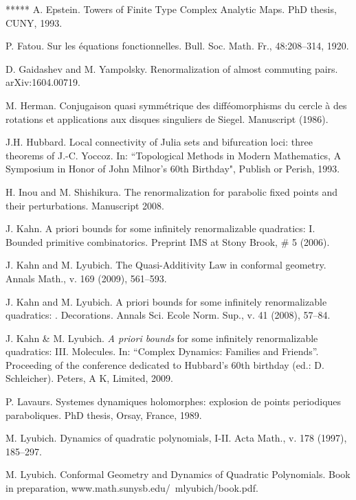 \documentclass{amsart}
\newcommand{\1}{{\mathbb 1 }}
\theoremstyle{remark}
\numberwithin{equation}{section}
\theoremstyle{definition}
\newcommand{\RN}[1]{\MakeUppercase{\romannumeral#1}}%
\begin{document}
\begin{thebibliography}{*****}
  A. Epstein. Towers of Finite Type Complex Analytic Maps. PhD thesis, CUNY, 1993.
  

 P. Fatou. Sur les équations fonctionnelles. Bull. Soc. Math. Fr., 48:208–314, 1920.

  
 D. Gaidashev and M. Yampolsky. Renormalization of almost commuting pairs. arXiv:1604.00719.


 M. Herman. Conjugaison quasi symm\'etrique des diff\'eomorphisms du cercle \`a des rotations
et applications aux disques singuliers de Siegel. Manuscript (1986).


 J.H. Hubbard.
   Local connectivity of Julia sets and bifurcation
     loci: three theorems of J.-C. Yoccoz. In:
    ``Topological Methods in Modern Mathematics, A Symposium in
     Honor of John Milnor's 60th Birthday", Publish or Perish, 1993.




 H. Inou and M. Shishikura.
  The renormalization for parabolic fixed points and their
  perturbations. Manuscript 2008. 

  J. Kahn. A priori bounds for some infinitely
  renormalizable quadratics: I. Bounded primitive
  combinatorics. Preprint IMS at Stony Brook, \# 5 (2006). 


 J. Kahn and M. Lyubich. The Quasi-Additivity Law in conformal geometry. Annals Math., v. 169 (2009), 561--593.

   J. Kahn and M. Lyubich. A priori bounds for some infinitely renormalizable quadratics: \RN{2}. Decorations. Annals Sci. Ecole Norm. Sup., v. 41 (2008), 57--84.


 J. Kahn \& M. Lyubich. {\it A priori bounds} for some infinitely
renormalizable quadratics: III.  Molecules.  In: ``Complex Dynamics: Families and Friends''.
    Proceeding of the conference dedicated to Hubbard's 60th birthday (ed.:  D. Schleicher). 
    Peters, A K, Limited, 2009. 

 P. Lavaurs. Systemes dynamiques holomorphes: explosion de points periodiques paraboliques. PhD thesis, Orsay, France, 1989.

  M. Lyubich. Dynamics of quadratic polynomials, I-II. Acta Math., v. 178 (1997), 185--297.

 M. Lyubich. Conformal Geometry and Dynamics of
  Quadratic Polynomials. Book in preparation, www.math.sunysb.edu/~mlyubich/book.pdf. 


\end{thebibliography}
\end{document}
